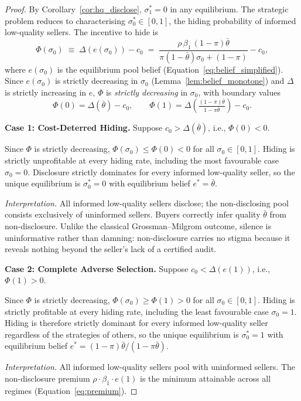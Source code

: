 \documentclass[10pt,letterpaper]{bp-template-concise}
\begin{document}
\begin{proof}
By Corollary~\ref{cor:hq_disclose}, $\sigma_1^* = 0$ in any equilibrium. The strategic problem reduces to characterising $\sigma_0^* \in [0,1]$, the hiding probability of informed low-quality sellers. The incentive to hide is
\[
    \Phi(\sigma_0) \;\equiv\; \Delta\!\left(e(\sigma_0)\right) - c_0
    \;=\; \frac{\rho\,\beta_1\,(1-\pi)\bar{\theta}}{\pi(1-\bar{\theta})\sigma_0 + (1-\pi)} - c_0,
\]
where $e(\sigma_0)$ is the equilibrium pool belief (Equation~\eqref{eq:belief_simplified}). Since $e(\sigma_0)$ is strictly decreasing in $\sigma_0$ (Lemma~\ref{lem:belief_monotone}) and $\Delta$ is strictly increasing in $e$, $\Phi$ is \emph{strictly decreasing} in $\sigma_0$, with boundary values
\[
    \Phi(0) = \Delta(\bar{\theta}) - c_0, \qquad
    \Phi(1) = \Delta\!\left(\tfrac{(1-\pi)\bar{\theta}}{1-\pi\bar{\theta}}\right) - c_0.
\]

\medskip
\textbf{Case 1: Cost-Deterred Hiding.} Suppose $c_0 > \Delta(\bar{\theta})$, i.e., $\Phi(0) < 0$.

Since $\Phi$ is strictly decreasing, $\Phi(\sigma_0) \leq \Phi(0) < 0$ for all $\sigma_0 \in [0,1]$. Hiding is strictly unprofitable at every hiding rate, including the most favourable case $\sigma_0 = 0$. Disclosure strictly dominates for every informed low-quality seller, so the unique equilibrium is $\sigma_0^* = 0$ with equilibrium belief $e^* = \bar{\theta}$.

\textit{Interpretation.} All informed low-quality sellers disclose; the non-disclosing pool consists exclusively of uninformed sellers. Buyers correctly infer quality $\bar{\theta}$ from non-disclosure. Unlike the classical Grossman--Milgrom outcome, silence is uninformative rather than damning: non-disclosure carries no stigma because it reveals nothing beyond the seller's lack of a certified audit.

\medskip
\textbf{Case 2: Complete Adverse Selection.} Suppose $c_0 < \Delta(e(1))$, i.e., $\Phi(1) > 0$.

Since $\Phi$ is strictly decreasing, $\Phi(\sigma_0) \geq \Phi(1) > 0$ for all $\sigma_0 \in [0,1]$. Hiding is strictly profitable at every hiding rate, including the least favourable case $\sigma_0 = 1$. Hiding is therefore strictly dominant for every informed low-quality seller regardless of the strategies of others, so the unique equilibrium is $\sigma_0^* = 1$ with equilibrium belief $e^* = (1-\pi)\bar{\theta}/(1-\pi\bar{\theta})$.

\textit{Interpretation.} All informed low-quality sellers pool with uninformed sellers. The non-disclosure premium $\rho\cdot\beta_1\cdot e(1)$ is the minimum attainable across all regimes (Equation~\eqref{eq:premium}).


\end{proof}
\end{document}

